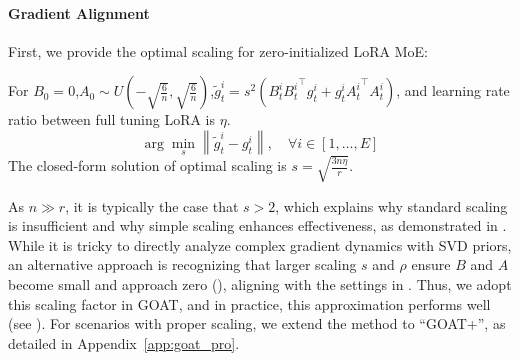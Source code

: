 \paragraph{Gradient Alignment}
First, we provide the optimal scaling for zero-initialized LoRA MoE:
\begin{theorem}\label{th:s}
For \( B_0 = 0 \),\( A_0 \sim U\left(-\sqrt{\frac{6}{n}}, \sqrt{\frac{6}{n}}\right) \),$\tilde{g}_t^i = s^2 \left( B_t^i {B_t^i}^\top g_t^i + g_t^i {A_t^i}^\top A_t^i \right)$, and learning rate ratio between full tuning \vs LoRA is $\eta$. 
\begin{equation}
    \arg\min_{s} \left\| \tilde{g}_t^i - g_t^i \right\|, \quad \forall i \in [1, \dots, E]
\end{equation}
The closed-form solution of optimal scaling is \( s = \sqrt{\frac{3n\eta}{r}} \).
\end{theorem}
As \(n \gg r\), it is typically the case that \(s > 2\), which explains why standard scaling is insufficient and why simple scaling enhances effectiveness, as demonstrated in .
While it is tricky to directly analyze complex gradient dynamics with SVD priors, an alternative approach is recognizing that larger scaling \(s\) and \(\rho\) ensure $B$ and $A$ become small and approach zero (), aligning with the settings in . Thus, we adopt this scaling factor in GOAT, and in practice, this approximation performs well (see ). For scenarios with proper scaling, we extend the method to ``GOAT+'', as detailed in Appendix~\ref{app:goat_pro}.



